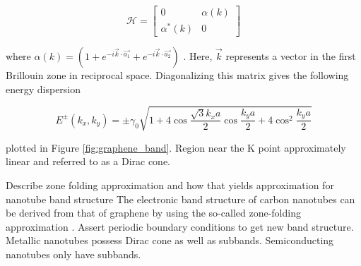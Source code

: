 \begin{equation}
	\mathcal{H} = \begin{bmatrix} 
	0 & \alpha(k) \\
	\alpha^*(k) & 0
	\end{bmatrix}
\end{equation}

where $\alpha(k) = (1 + e^{-i \vec{k}\cdot \vec{a_1}} + e^{-i \vec{k}\cdot \vec{a_2}})$ \cite{charlier2007electronic}. Here, $\vec{k}$ represents a vector in the first Brillouin zone in reciprocal space. Diagonalizing this matrix gives the following energy dispersion 

\begin{equation}
	E^{\pm} (k_x, k_y) = \pm \gamma_0 \sqrt{1 + 4 \cos\dfrac{\sqrt{3}k_x a}{2}\cos\dfrac{k_y a}{2} + 4 \cos^2 \dfrac{k_y a}{2}} 
\end{equation} 

plotted in Figure \ref{fig:graphene_band}. Region near the K point approximately linear and referred to as a Dirac cone. 


{\color{red} Describe zone folding approximation and how that yields approximation for nanotube band structure}
The electronic band structure of carbon nanotubes can be derived from that of graphene by using the so-called zone-folding approximation \cite{charlier2007electronic}. Assert periodic boundary conditions to get new band structure. Metallic nanotubes possess Dirac cone as well as subbands. Semiconducting nanotubes only have subbands.
 
